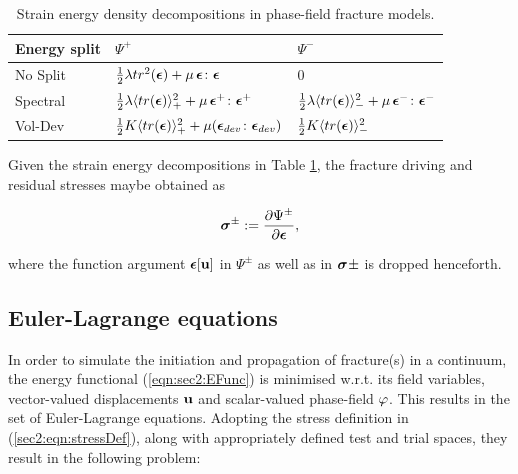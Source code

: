 \documentclass[11pt]{article}
\begin{document}
\begingroup
\renewcommand{\arraystretch}{1.3}
\begin{table}[ht!]
    \centering
    \setlength\fboxsep{0pt}
    \begin{tabular}{lll} \hline
    Energy split  & $\Psi^+$ & $\Psi^-$  \\ \hline
    No Split \cite{Bourdin2000} & $\frac{1}{2} \lambda tr^2(\hbox{$\hbox{\boldmath$\epsilon$}$}) + \mu \, \hbox{$\hbox{\boldmath$\epsilon$}$} \colon \hbox{$\hbox{\boldmath$\epsilon$}$}$  & 0  \\ 
    Spectral \cite{Miehe2010}  & $\frac{1}{2} \lambda \langle tr(\hbox{$\hbox{\boldmath$\epsilon$}$}) \rangle_+^2 + \mu \, \hbox{$\hbox{\boldmath$\epsilon$}$}^+ \colon \hbox{$\hbox{\boldmath$\epsilon$}$}^+$ & $\frac{1}{2} \lambda \langle tr(\hbox{$\hbox{\boldmath$\epsilon$}$}) \rangle_-^2 + \mu \, \hbox{$\hbox{\boldmath$\epsilon$}$}^- \colon \hbox{$\hbox{\boldmath$\epsilon$}$}^-$  \\ 
    Vol-Dev \cite{amor2009regularized}  & $\frac{1}{2} K \langle tr(\hbox{$\hbox{\boldmath$\epsilon$}$}) \rangle_+^2 + \mu ( \hbox{$\hbox{\boldmath$\epsilon$}$}_{dev} \colon \hbox{$\hbox{\boldmath$\epsilon$}$}_{dev} )$ & $\frac{1}{2} K \langle tr(\hbox{$\hbox{\boldmath$\epsilon$}$}) \rangle_-^2$ \\ \hline
    \end{tabular}
    \caption{Strain energy density decompositions in phase-field fracture models.}
    \label{sec2:table:energySplits}
\end{table}
\endgroup

\noindent Given the strain energy decompositions in Table \ref{sec2:table:energySplits}, the fracture driving and residual stresses maybe obtained as 

\begin{equation}\label{sec2:eqn:stressDef}
    \hbox{$\hbox{\boldmath$\sigma$}$}^{\pm} := \dfrac{\partial \Psi^{\pm}}{\partial \hbox{$\hbox{\boldmath$\epsilon$}$}},
\end{equation}

\noindent where the function argument $\hbox{$\hbox{\boldmath$\epsilon$}$}[\hbox{$\mathbf{u}$}]$ in $\Psi^{\pm}$ as well as in $\hbox{$\hbox{\boldmath$\sigma$}$}^{}\pm$ is dropped henceforth.

\subsection{Euler-Lagrange equations}

In order to simulate the initiation and propagation of fracture(s) in a continuum, the energy functional (\ref{eqn:sec2:EFunc}) is minimised w.r.t. its field variables, vector-valued displacements $\hbox{$\mathbf{u}$}$ and scalar-valued phase-field $\hbox{$\varphi$}$. This results in the set of Euler-Lagrange equations. Adopting the stress definition in (\ref{sec2:eqn:stressDef}), along with appropriately defined test and trial spaces, they result in the following problem: 
\end{document}
